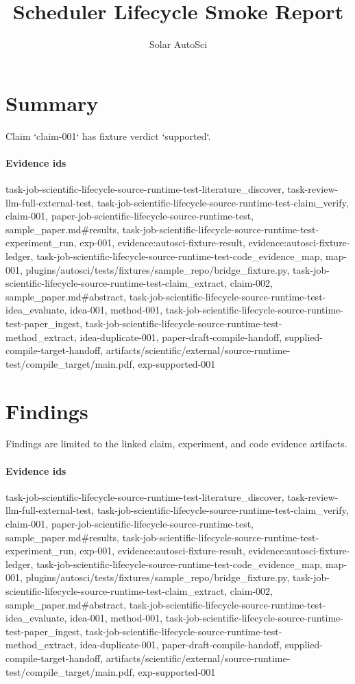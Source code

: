 \documentclass{article}
\title{Scheduler Lifecycle Smoke Report}
\author{Solar AutoSci}
\date{}
\begin{document}
\maketitle

\section{Summary}
Claim `claim-001` has fixture verdict `supported`.

\paragraph{Evidence ids} task-job-scientific-lifecycle-source-runtime-test-literature\_discover, task-review-llm-full-external-test, task-job-scientific-lifecycle-source-runtime-test-claim\_verify, claim-001, paper-job-scientific-lifecycle-source-runtime-test, sample\_paper.md\#results, task-job-scientific-lifecycle-source-runtime-test-experiment\_run, exp-001, evidence:autosci-fixture-result, evidence:autosci-fixture-ledger, task-job-scientific-lifecycle-source-runtime-test-code\_evidence\_map, map-001, plugins/autosci/tests/fixtures/sample\_repo/bridge\_fixture.py, task-job-scientific-lifecycle-source-runtime-test-claim\_extract, claim-002, sample\_paper.md\#abstract, task-job-scientific-lifecycle-source-runtime-test-idea\_evaluate, idea-001, method-001, task-job-scientific-lifecycle-source-runtime-test-paper\_ingest, task-job-scientific-lifecycle-source-runtime-test-method\_extract, idea-duplicate-001, paper-draft-compile-handoff, supplied-compile-target-handoff, artifacts/scientific/external/source-runtime-test/compile\_target/main.pdf, exp-supported-001

\section{Findings}
Findings are limited to the linked claim, experiment, and code evidence artifacts.

\paragraph{Evidence ids} task-job-scientific-lifecycle-source-runtime-test-literature\_discover, task-review-llm-full-external-test, task-job-scientific-lifecycle-source-runtime-test-claim\_verify, claim-001, paper-job-scientific-lifecycle-source-runtime-test, sample\_paper.md\#results, task-job-scientific-lifecycle-source-runtime-test-experiment\_run, exp-001, evidence:autosci-fixture-result, evidence:autosci-fixture-ledger, task-job-scientific-lifecycle-source-runtime-test-code\_evidence\_map, map-001, plugins/autosci/tests/fixtures/sample\_repo/bridge\_fixture.py, task-job-scientific-lifecycle-source-runtime-test-claim\_extract, claim-002, sample\_paper.md\#abstract, task-job-scientific-lifecycle-source-runtime-test-idea\_evaluate, idea-001, method-001, task-job-scientific-lifecycle-source-runtime-test-paper\_ingest, task-job-scientific-lifecycle-source-runtime-test-method\_extract, idea-duplicate-001, paper-draft-compile-handoff, supplied-compile-target-handoff, artifacts/scientific/external/source-runtime-test/compile\_target/main.pdf, exp-supported-001
\end{document}
